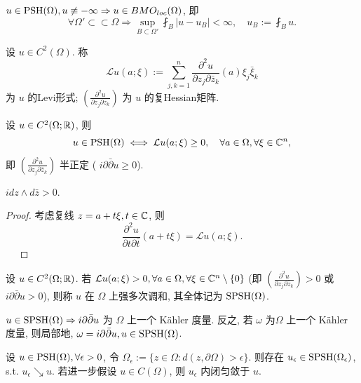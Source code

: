 \begin{remark}
  $u \in \operatorname{PSH}(\Omega ), u \not \equiv -\infty  \Rightarrow u \in BMO_{loc}(\Omega )$, 即 
  $$ \forall \Omega ' \subset \subset \Omega \Rightarrow  \sup_{B \subset \Omega '} \fint_B \left| u-u_B \right| <\infty , \quad u_B:=\fint_B u. $$ 
\end{remark}


\begin{definition}
  设 $u \in C^2 (\Omega )$. 称 
  $$ \mathcal{L}u(a;\xi ):= \sum_{j,k=1}^{n}\frac{\partial^2 u}{\partial z_j \partial \bar{z}_k}(a) \xi _j \bar{\xi }_k $$ 
  为 $u$ 的Levi形式; $\left( \frac{\partial^2 u}{\partial z_j \partial \bar{z}_k} \right)$ 为 $u$ 的复Hessian矩阵.  
\end{definition}

\begin{proposition}
  设 $u \in C^2(\Omega ; {\mathbb R})$, 则 
  $$ u \in \operatorname{PSH} (\Omega ) \iff \mathcal{L} u (a;\xi ) \geq 0, \quad \forall a \in \Omega , \forall \xi \in {\mathbb C}^n ,$$ 
  即 $\left( \frac{\partial^2 u}{\partial z_j \partial \bar{z}_k} \right)$ 半正定 ( $i \partial \bar{\partial }u \geq 0$). 
\end{proposition}
\begin{remark}
  $i dz \wedge d \bar{z}>0$. 
\end{remark}
\begin{proof}
  考虑复线 $z=a+t \xi , t \in {\mathbb C}$, 则 
  $$ \frac{\partial^2 u }{\partial t \partial \bar{t}}(a+t \xi )=\mathcal{L}u(a;\xi ). $$
  ~~ 
\end{proof}

\begin{definition}
  设 $u \in C^2(\Omega ;{\mathbb R})$. 若 $\mathcal{L}u(a;\xi )>0, \forall a \in \Omega , \forall \xi \in {\mathbb C}^n \setminus \{0\}$ (即 $\left( \frac{\partial^2 u }{\partial z_j \partial \bar{z}_k} \right)>0$ 或 $i \partial \bar{\partial }u>0$), 则称 $u$ 在 $\Omega $ 上强多次调和, 其全体记为 $\operatorname{SPSH} (\Omega )$.     
\end{definition}

\begin{remark}
  $u \in \operatorname{SPSH} (\Omega ) \Rightarrow i \partial \bar{\partial } u$ 为 $\Omega $ 上一个 K\"ahler 度量.  
  反之, 若 $\omega $ 为$\Omega $ 上一个 K\"ahler 度量, 则局部地, $\omega = i \partial \bar{\partial } u, u \in \operatorname{SPSH} (\Omega )$.  
\end{remark}

\begin{theorem}\label{th2.1}
  设 $u \in \operatorname{PSH}(\Omega ), \forall \epsilon >0$, 令 $\Omega _{\epsilon }:=\{z \in \Omega : d(z, \partial  \Omega )>\epsilon \}$. 则存在 $u_{\epsilon } \in \operatorname{SPSH} (\Omega_{\epsilon } )$, s.t. $u_{\epsilon } \searrow u$. 
  若进一步假设 $u \in C(\Omega )$, 则 $u_{\epsilon }$ 内闭匀敛于 $u$.       
\end{theorem}

